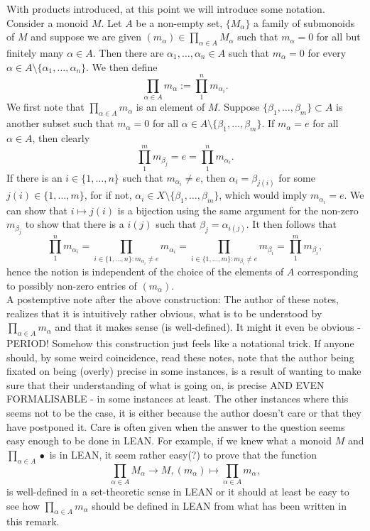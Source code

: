 \begin{remark}\label{BinaryOperationOverArbitrarySetIsWellDefinedWhenAllButFinitelyManyEntriesAreZero}
    With products introduced, at this point we will introduce some notation. Consider a monoid $M$. Let $A$ be a non-empty set, $\{M_\alpha\}$ a family of submonoids of $M$ and suppose we are given $(m_\alpha)\in \prod_{\alpha \in A} M_\alpha$ such that $m_\alpha = 0$ for all but finitely many $\alpha\in A$. Then there are $\alpha_1,\dots,\alpha_n\in A$ such that $m_\alpha=0$ for every $\alpha\in A\setminus\{\alpha_1,\dots,\alpha_n\}$. We then define 
    $$\prod_{\alpha\in A} m_\alpha := \prod_1^n m_{\alpha_i}.$$
    We first note that $\prod_{\alpha\in A} m_\alpha$ is an element of $M$. Suppose $\{\beta_1,\dots,\beta_m\}\subset A$ is another subset such that $m_\alpha = 0$ for all $\alpha \in A\setminus \{\beta_1,\dots,\beta_m\}$. If $m_\alpha = e$ for all $\alpha\in A$, then clearly 
    $$\prod_1^m m_{\beta_j} = e = \prod_1^n m_{\alpha_i}.$$
    If there is an $i\in \{1,\dots,n\}$ such that $m_{\alpha_i} \neq e$, then $\alpha_i = \beta_{j(i)}$ for some $j(i)\in \{1,\dots,m\}$, for if not, $\alpha_i \in X\setminus \{\beta_1,\dots,\beta_m\}$, which would imply $m_{\alpha_i} = e$. We can show that $i\mapsto j(i)$ is a bijection using the same argument for the non-zero $m_{\beta_j}$ to show that there is a $i(j)$ such that $\beta_j = \alpha_{i(j)}$. It then follows that 
    $$\prod_1^n m_{\alpha_i} = \prod_{i\in \{1,\dots,n\} : m_{\alpha_i} \neq e} m_{\alpha_i} = \prod_{i\in \{1,\dots,m\} : m_{\beta_i}\neq e} m_{\beta_i} = \prod_1^m m_{\beta_i},$$
    hence the notion is independent of the choice of the elements of $A$ corresponding to possibly non-zero entries of $(m_\alpha)$.\\
    A postemptive note after the above construction: The author of these notes, realizes that it is intuitively rather obvious, what is to be understood by $\prod_{\alpha\in A} m_\alpha$ and that it makes sense (is well-defined). It might it even be obvious - PERIOD! Somehow this construction just feels like a notational trick. If anyone should, by some weird coincidence, read these notes, note that the author being fixated on being (overly) precise in some instances, is a result of wanting to make sure that their understanding of what is going on, is precise AND EVEN FORMALISABLE - in some instances at least. The other instances where this seems not to be the case, it is either because the author doesn't care or that they have postponed it. Care is often given when the answer to the question seems easy enough to be done in LEAN. For example, if we knew what a monoid $M$ and $\prod_{\alpha \in A} \bullet$ is in LEAN, it seem rather easy(?) to prove that the function 
    $$\prod_{\alpha\in A} M_\alpha \rightarrow M, (m_\alpha)\mapsto \prod_{\alpha\in A} m_\alpha,$$
    is well-defined in a set-theoretic sense in LEAN or it should at least be easy to see how $\prod_{\alpha \in A} m_\alpha$ should be defined in LEAN from what has been written in this remark. 
\end{remark}
